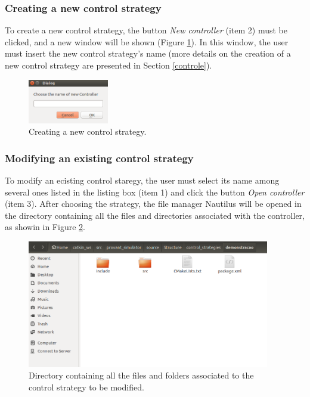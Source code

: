 \subsubsection{Creating a new control strategy}

To create a new control strategy, the button \textit{New controller} (item 2) must be clicked, and a new window will be shown (Figure \ref{9}). In this window, the user must insert the new control strategy's name (more details on the creation of a new control strategy are presented in Section \ref{controle}).

\begin{figure}[!ht]
	\centering
	\includegraphics[width=100pt]{figuras/9.png}
	\caption{Creating a new control strategy.}
	\label{9}
\end{figure}

\subsubsection{Modifying an existing control strategy}

To modify an ecisting control staregy, the user must select its name among several ones listed in the listing box (item 1) and click the button \textit{Open controller} (item 3). After choosing the strategy, the file manager Nautilus will be opened in the directory containing all the files and directories associated with the controller, as showin in Figure \ref{10}.

\begin{figure}[!ht]
	\centering
	\includegraphics[width=300pt]{figuras/10.png}
	\caption{Directory containing all the files and folders associated to the control strategy to be modified.}
	\label{10}
\end{figure}

